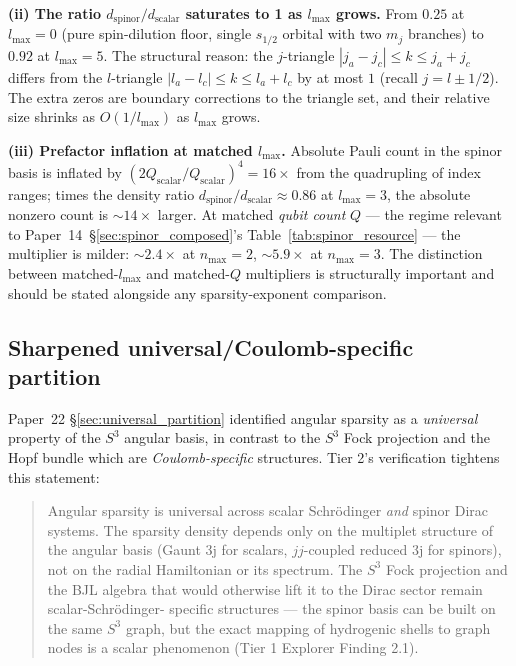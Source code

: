\textbf{(ii) The ratio $d_{\mathrm{spinor}}/d_{\mathrm{scalar}}$ saturates to 1 as $l_{\max}$ grows.}
From $0.25$ at $l_{\max}=0$ (pure spin-dilution floor, single
$s_{1/2}$ orbital with two $m_j$ branches) to $0.92$ at $l_{\max}=5$.
The structural reason: the $j$-triangle
$|j_a - j_c| \leq k \leq j_a + j_c$ differs from the $l$-triangle
$|l_a - l_c| \leq k \leq l_a + l_c$ by at most $1$ (recall
$j = l \pm 1/2$). The extra zeros are boundary corrections to the
triangle set, and their relative size shrinks as $O(1/l_{\max})$ as
$l_{\max}$ grows.

\textbf{(iii) Prefactor inflation at matched $l_{\max}$.}
Absolute Pauli count in the spinor basis is inflated by
$(2Q_{\mathrm{scalar}}/Q_{\mathrm{scalar}})^4 = 16\times$ from the
quadrupling of index ranges; times the density ratio
$d_{\mathrm{spinor}}/d_{\mathrm{scalar}} \approx 0.86$ at $l_{\max}=3$,
the absolute nonzero count is $\sim 14\times$ larger. At matched
\emph{qubit count} $Q$ --- the regime relevant to
Paper~14~\S\ref{sec:spinor_composed}'s
Table~\ref{tab:spinor_resource} --- the multiplier is milder:
$\sim 2.4\times$ at $n_{\max}=2$, $\sim 5.9\times$ at $n_{\max}=3$.
The distinction between matched-$l_{\max}$ and matched-$Q$
multipliers is structurally important and should be stated
alongside any sparsity-exponent comparison.

\subsection{Sharpened universal/Coulomb-specific partition}

Paper~22 \S\ref{sec:universal_partition} identified angular sparsity
as a \emph{universal} property of the $S^3$ angular basis, in contrast
to the $S^3$ Fock projection and the Hopf bundle which are
\emph{Coulomb-specific} structures. Tier 2's verification tightens
this statement:

\begin{quote}
Angular sparsity is universal across scalar Schr\"odinger \emph{and}
spinor Dirac systems. The sparsity density depends only on the
multiplet structure of the angular basis (Gaunt 3j for scalars,
$jj$-coupled reduced 3j for spinors), not on the radial Hamiltonian
or its spectrum. The $S^3$ Fock projection and the BJL algebra that
would otherwise lift it to the Dirac sector remain scalar-Schr\"odinger-
specific structures --- the spinor basis can be built on the same
$S^3$ graph, but the exact mapping of hydrogenic shells to graph
nodes is a scalar phenomenon (Tier 1 Explorer Finding 2.1).
\end{quote}

